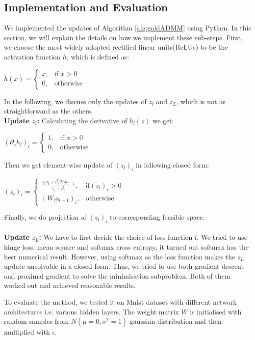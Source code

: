 \documentclass[letterpaper, 10 pt, conference]{ieeeconf}  %
\begin{document}
\subsection{Implementation and Evaluation}
We implemented the updates of  Algorithm \ref{alg:goldADMM} using Python. In this section, we will explain the details on how we implement these sub-steps. First, we choose the most widely adopted rectified linear units(ReLUs) to be the activation function $h$, which is defined as:
\begin{center}
$h(x) = \begin{cases} x, & \mbox{if } x> 0 \\0, & \mbox{otherwise }\end{cases} $
\end{center}

In the following, we discuss only the updates of $z_l$ and $z_L$, which is not as straightforward as the others.\\
\textbf{Update $z_l$:  }  Calculating the derivative of $h_l(z)$  we get:
\begin{center}
$(\partial_z h_l)_i = \begin{cases} 1, & \mbox{if } x> 0 \\0, & \mbox{otherwise }\end{cases} $
\end{center}
Then we get element-wise update of $(z_l)_i$ in following closed form:
\begin{center}
$(z_l)_i = \begin{cases} \frac{\gamma_la_l + \beta_lW_la_{l-1}}{\gamma_l + \beta_l}, & \mbox{if} (z_l)_i> 0 \\(W_la_{l-1})_i, & \mbox{otherwise}\end{cases} $
\end{center}
Finally, we do projection of $(z_l)_i$ to corresponding feasible space. \\\\
\textbf{Update $z_L$:  }  We have to first decide the choice of loss function $l$. We tried to use hinge loss, mean square and softmax cross entropy, it turned out softmax has the best numerical result. However, using softmax as the loss function makes the $z_L$ update unsolvable in a closed form. Thus, we tried to use both gradient descent and proximal gradient to solve the minimisation subproblem. Both of them worked out and achieved reasonable results. 

To evaluate the method, we tested it on Mnist dataset with different network architectures i.e. various hidden layers. The weight matrix $W$ is initialised with random samples from $N(\mu=0, \sigma^2=1)$ gaussian distribution and then multiplied with $\epsilon$. 
\end{document}
